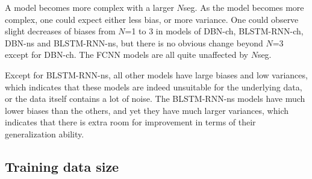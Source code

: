 A model becomes more complex with a larger $N$seg. As the model becomes more complex, one could expect either less bias, or more variance. One could observe slight decreases of biases from $N$=1 to 3 in models of DBN-ch, BLSTM-RNN-ch, DBN-ns and BLSTM-RNN-ns, but there is no obvious change beyond $N$=3 except for DBN-ch. The FCNN models are all quite unaffected by $N$seg.

Except for BLSTM-RNN-ns, all other models have large biases and low variances, which indicates that these models are indeed unsuitable for the underlying data, or the data itself contains a lot of noise. The BLSTM-RNN-ns models have much lower biases than the others, and yet they have much larger variances, which indicates that there is extra room for improvement in terms of their generalization ability.

\subsection{Training data size}\label{sec:3-p5}


